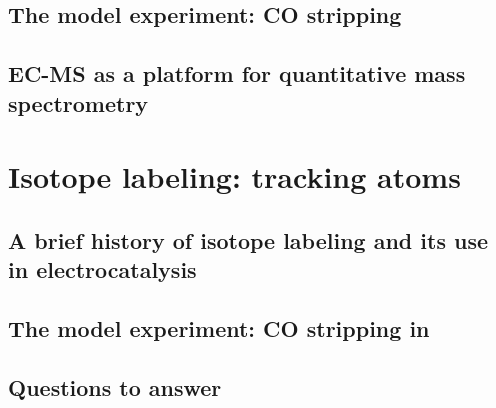 \subsection{The model experiment: CO stripping}
\subsection{EC-MS as a platform for quantitative mass spectrometry}

\section{Isotope labeling: tracking atoms}
\subsection{A brief history of isotope labeling and its use in electrocatalysis}
\subsection{The model experiment: CO stripping in }
\subsection{Questions to answer}